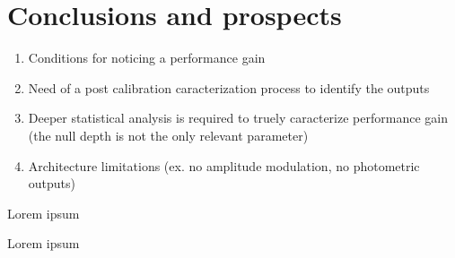 \documentclass{aa}
\begin{document}

\section{Conclusions and prospects}

   \begin{enumerate}
      \item Conditions for noticing a performance gain
      \item Need of a post calibration caracterization process to identify the outputs
      \item Deeper statistical analysis is required to truely caracterize performance gain (the null depth is not the only relevant parameter)
      \item Architecture limitations (ex. no amplitude modulation, no photometric outputs)
   \end{enumerate}

\begin{acknowledgements}
      Lorem ipsum
\end{acknowledgements}

%
%

\begin{thebibliography}{}

   Lorem ipsum

\end{thebibliography}
\end{document}
